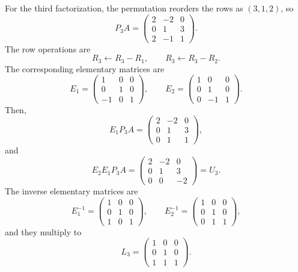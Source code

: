 \documentclass[10pt]{extarticle}
\begin{document}
\begin{enumerate}[label=(\alph*)]
For the third factorization, the permutation reorders the rows as $(3,1,2)$, so
\[
P_3A=
\begin{pmatrix}
2 & -2 & 0\\
0 & 1 & 3\\
2 & -1 & 1
\end{pmatrix}.
\]
The row operations are
\[
R_3\leftarrow R_3-R_1,\qquad R_3\leftarrow R_3-R_2.
\]
The corresponding elementary matrices are
\[
E_1=
\begin{pmatrix}
1 & 0 & 0\\
0 & 1 & 0\\
-1 & 0 & 1
\end{pmatrix},
\qquad
E_2=
\begin{pmatrix}
1 & 0 & 0\\
0 & 1 & 0\\
0 & -1 & 1
\end{pmatrix}.
\]
Then,
\[
E_1P_3A=
\begin{pmatrix}
2 & -2 & 0\\
0 & 1 & 3\\
0 & 1 & 1
\end{pmatrix},
\]
and
\[
E_2E_1P_3A=
\begin{pmatrix}
2 & -2 & 0\\
0 & 1 & 3\\
0 & 0 & -2
\end{pmatrix}
=U_3.
\]
The inverse elementary matrices are
\[
E_1^{-1}=
\begin{pmatrix}
1 & 0 & 0\\
0 & 1 & 0\\
1 & 0 & 1
\end{pmatrix},
\qquad
E_2^{-1}=
\begin{pmatrix}
1 & 0 & 0\\
0 & 1 & 0\\
0 & 1 & 1
\end{pmatrix},
\]
and they multiply to
\[
L_3=
\begin{pmatrix}
1 & 0 & 0\\
0 & 1 & 0\\
1 & 1 & 1
\end{pmatrix}.
\]


\end{enumerate}
\end{document}
